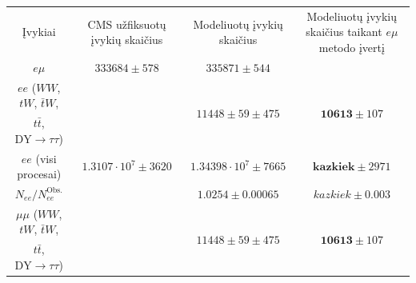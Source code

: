 \documentclass[a4paper, 12pt]{article}
\newcommand{\WW}{W\! W}
\newcommand{\mumu}{\mu\mu}
\newcommand{\DYtau}{\mathrm{DY} \! \rightarrow \! \tau\tau}
\begin{document}
\begin{centering}
\begin{table}
\begin{tabular}{|c|c|c|c|} %
	\hline
	
	\multirow{3}{8em}{\centering Įvykiai} &
	\multirow{3}{7em}{\centering CMS užfiksuotų įvykių skaičius} &
	\multirow{3}{9em}{\centering Modeliuotų įvykių skaičius} &
	\multirow{3}{10em}{\centering Modeliuotų įvykių skaičius taikant $e\mu$ metodo įvertį} \\
	
 	& & & \\
 	& & & \\
	\hline \hline
	
	\multirow{2}{8em}{\centering $e\mu$} &
	\multirow{2}{7em}{\centering $333684 \pm 578$} &
	\multirow{2}{9em}{\centering $335871 \pm 544$ } &
	\multirow{2}{5em}{\centering \textendash }\\
	
 	& & & \\
	\hline
	$ee$ ($\WW$, $tW$, $\bar{t}W$, &
	\multirow{2}{7em}{\centering\textendash} &
	\multirow{2}{9em}{\centering $11448 \pm 59 \pm 475$} &
	\multirow{2}{9em}{\centering$\mathbf{10613} \pm 107$} \\
	
	$t\bar{t}$, $\DYtau$) & & & \\
	\hline
	\multirow{2}{8em}{\centering $ee$ (visi procesai)} &
	\multirow{2}{7em}{\centering $1.3107 \cdot 10^7 \pm 3620$} &
	\multirow{2}{10em}{\centering $1.34398 \cdot 10^7 \pm 7665$}
	&\multirow{2}{10em}{\centering $\mathbf{kazkiek} \pm 2971$} \\
	
 	& & & \\
	\hline

	\multirow{2}{8em}{\centering $N_{ee}/N_{ee}^{\mathrm{Obs.}}$} &
	\multirow{2}{7em}{\centering 1} &
	\multirow{2}{10em}{\centering $1.0254 \pm 0.00065$} &
	\multirow{2}{10em}{\centering $kazkiek \pm 0.003$} \\
	
 	& & & \\
	\hline
	$\mumu$ ($\WW$, $tW$, $\bar{t}W$, &
	\multirow{2}{7em}{\centering\textendash} &
	\multirow{2}{9em}{\centering $11448 \pm 59 \pm 475$} &
	\multirow{2}{9em}{\centering$\mathbf{10613} \pm 107$} \\
	
	$t\bar{t}$, $\DYtau$) & & & \\
	\hline
	

\end{tabular}
\end{table}
\end{centering}
\end{document}
